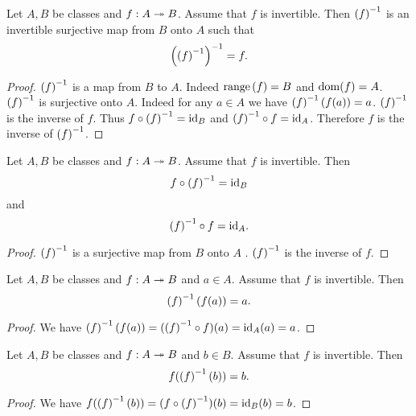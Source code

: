 \documentclass[../../set-theory/set-theory.tex]{subfiles}
\begin{document}
  \begin{forthel}
    \begin{proposition}
      Let $A, B$ be classes and $f : A \twoheadrightarrow B$.
      Assume that $f$ is invertible.
      Then $\left(f\right)^{-1}$ is an invertible surjective map from $B$ onto $A$ such that
      \[ \left(\left(f\right)^{-1}\right)^{-1} = f. \]
    \end{proposition}
    \begin{proof}
      $\left(f\right)^{-1}$ is a map from $B$ to $A$.
      Indeed $\mathrm{range}\left(f\right) = B$ and $\operatorname{dom}(f) = A$.
      $\left(f\right)^{-1}$ is surjective onto $A$.
      Indeed for any $a \in A$ we have $\left(f\right)^{-1}(f(a)) = a$.
      $\left(f\right)^{-1}$ is the inverse of $f$.
      Thus $f \circ \left(f\right)^{-1} = \mathrm{id}_{B}$ and $\left(f\right)^{-1} \circ f = \mathrm{id}_{A}$.
      Therefore $f$ is the inverse of $\left(f\right)^{-1}$.
    \end{proof}
  \end{forthel}

  \begin{forthel}
    \begin{proposition}
      Let $A, B$ be classes and $f : A \twoheadrightarrow B$.
      Assume that $f$ is invertible.
      Then \[ f \circ \left(f\right)^{-1} = \mathrm{id}_{B} \] and \[ \left(f\right)^{-1} \circ f = \mathrm{id}_{A}. \]
    \end{proposition}
    \begin{proof}
      $\left(f\right)^{-1}$ is a surjective map from $B$ onto $A$ .
      $\left(f\right)^{-1}$ is the inverse of $f$.
    \end{proof}
  \end{forthel}

  \begin{forthel}
    \begin{proposition}
      Let $A, B$ be classes and $f : A \twoheadrightarrow B$ and $a \in A$.
      Assume that $f$ is invertible.
      Then \[ \left(f\right)^{-1}(f(a)) = a. \]
    \end{proposition}
    \begin{proof}
      We have $\left(f\right)^{-1}(f(a)) = (\left(f\right)^{-1} \circ f)(a) = \mathrm{id}_{A}(a) = a$.
    \end{proof}

    \begin{proposition}
      Let $A, B$ be classes and $f : A \twoheadrightarrow B$ and $b \in B$.
      Assume that $f$ is invertible.
      Then \[ f(\left(f\right)^{-1}(b)) = b. \]
    \end{proposition}
    \begin{proof}
      We have
      $f(\left(f\right)^{-1}(b))
        = (f \circ \left(f\right)^{-1})(b)
        = \mathrm{id}_{B}(b)
        = b$.
    \end{proof}
  \end{forthel}
\end{document}
